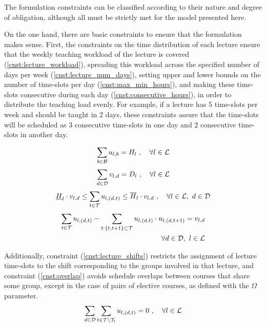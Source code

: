 The formulation constraints can be classified according to their nature and degree of obligation, although all must be strictly met for the model presented here.

On the one hand, there are basic constraints to ensure that the formulation makes sense. First, the constraints on the time distribution of each lecture ensure that the weekly teaching workload of the lecture is covered (\ref{cnst:lecture_workload}), spreading this workload across the specified number of days per week (\ref{cnst:lecture_num_days}), setting upper and lower bounds on the number of time-slots per day (\ref{cnst:max_min_hours}), and making these time-slots consecutive during each day (\ref{cnst:consecutive_hours}), in order to distribute the teaching load evenly. For example, if a lecture has 5 time-slots per week and should be taught in 2 days, these constraints assure that the time-slots will be scheduled as 3 consecutive time-slots in one day and 2 consecutive time-slots in another day. 

\begin{equation}
    \sum_{b\in\mathcal{B}} u_{l,b} = H_l \ , \quad \forall l \in \mathcal{L}
    \label{cnst:lecture_workload}
\end{equation}
\begin{equation}
    \sum_{d\in\mathcal{D}} v_{l,d} = D_l \ , \quad \forall l \in \mathcal{L}
    \label{cnst:lecture_num_days}
\end{equation}
\begin{equation}
    \underline{H}_{l} \cdot v_{l,d} \leq \sum_{t\in\mathcal{T}} u_{l,(d,t)} \leq \overline{H}_{l} \cdot v_{l,d} \ , \quad \forall l \in \mathcal{L}, \ d\in\mathcal{D}
    \label{cnst:max_min_hours}
\end{equation}
\begin{equation}
    \begin{split}
        \sum_{t\in\mathcal{T}} u_{l,(d,t)} - \sum_{t:\{t,t+1\}\subset\mathcal{T}} u_{l,(d,t)} \cdot u_{l,(d,t+1)} = v_{l,d} \\
        \quad \forall d\in\mathcal{D}, \ l \in \mathcal{L}
    \end{split}
    \label{cnst:consecutive_hours}
\end{equation}

Additionally, constraint (\ref{cnst:lecture_shifts}) restricts the assignment of lecture time-slots to the shift corresponding to the groups involved in that lecture, and constraint (\ref{cnst:overlap}) avoids schedule overlaps between courses that share some group, except in the case of pairs of elective courses, as defined with the $\Omega$ parameter.
\begin{equation}
    \sum_{d\in\mathcal{D}} \sum_{t\in \mathcal{T}\setminus\mathcal{T}_l} u_{l,(d,t)} = 0  \ , \quad \forall l \in \mathcal{L}
    \label{cnst:lecture_shifts}
\end{equation}

